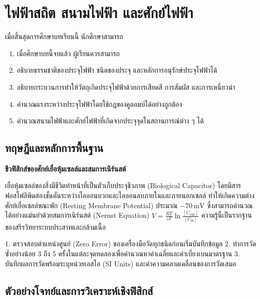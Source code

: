 \chapter{ไฟฟ้าสถิต สนามไฟฟ้า และศักย์ไฟฟ้า}
\label{ch:ch11_electrostatics}

\begin{conceptbox}[title=วัตถุประสงค์การเรียนรู้ประจำบท]
เมื่อสิ้นสุดการศึกษาบทเรียนนี้ นักศึกษาสามารถ
\begin{enumerate}
    \item เมื่อศึกษาบทนี้จบแล้ว ผู้เรียนควรสามารถ
    \item อธิบายธรรมชาติของประจุไฟฟ้า ชนิดของประจุ และหลักการอนุรักษ์ประจุไฟฟ้าได้
    \item อธิบายกระบวนการทำให้วัตถุเกิดประจุไฟฟ้าด้วยการเสียดสี การสัมผัส และการเหนี่ยวนำ
    \item คำนวณแรงระหว่างประจุไฟฟ้าโดยใช้กฎของคูลอมบ์ได้อย่างถูกต้อง
    \item คำนวณสนามไฟฟ้าและศักย์ไฟฟ้าที่เกิดจากประจุจุดในสถานการณ์ต่าง ๆ ได้
\end{enumerate}
\end{conceptbox}

\section{ทฤษฎีและหลักการพื้นฐาน}

\begin{bioappbox}
\textbf{ชีวฟิสิกส์ของศักย์เยื่อหุ้มเซลล์และสมการเนิร์นสต์}

เยื่อหุ้มเซลล์ของสิ่งมีชีวิตทำหน้าที่เป็นตัวเก็บประจุชีวภาพ (Biological Capacitor) โดยมีสารฟอสโฟลิพิดสองชั้นคั่นระหว่างไอออนบวกและไอออนลบภายในและภายนอกเซลล์ ทำให้เกิดความต่างศักย์เยื่อเซลล์ขณะพัก (Resting Membrane Potential) ประมาณ $-70\,\text{mV}$ ซึ่งสามารถคำนวณได้อย่างแม่นยำด้วยสมการเนิร์นสต์ (Nernst Equation) $V = \frac{RT}{zF} \ln\frac{[C_{\text{out}}]}{[C_{\text{in}}]}$ ความรู้นี้เป็นรากฐานของสรีรวิทยาระบบประสาทและกล้ามเนื้อ
\end{bioappbox}

\begin{labbox}
1. ตรวจสอบตำแหน่งศูนย์ (Zero Error) ของเครื่องมือวัดทุกชนิดก่อนเริ่มบันทึกข้อมูล
2. ทำการวัดซ้ำอย่างน้อย 3 ถึง 5 ครั้งในแต่ละจุดทดลองเพื่อคำนวณหาค่าเฉลี่ยและค่าเบี่ยงเบนมาตรฐาน
3. บันทึกผลการวัดพร้อมระบุหน่วยเอสไอ (SI Units) และค่าความคลาดเคลื่อนของการวัดเสมอ
\end{labbox}

\section{ตัวอย่างโจทย์และการวิเคราะห์เชิงฟิสิกส์}

